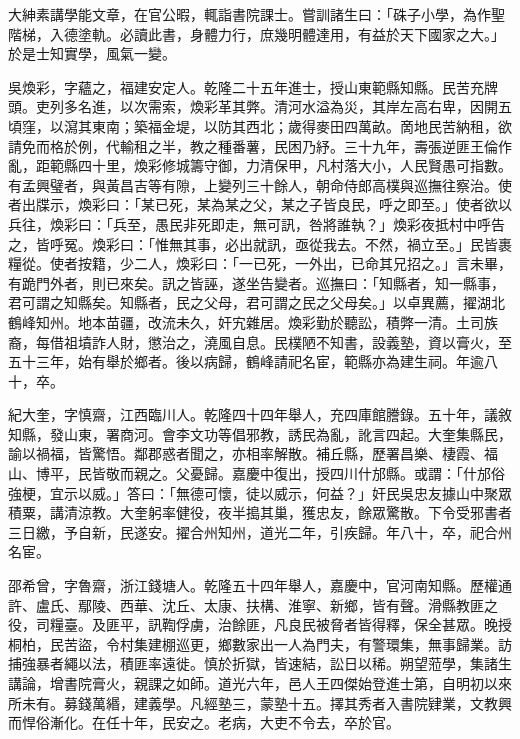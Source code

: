 \begin{pinyinscope}
大紳素講學能文章，在官公暇，輒詣書院課士。嘗訓諸生曰：「硃子小學，為作聖階梯，入德塗軌。必讀此書，身體力行，庶幾明體達用，有益於天下國家之大。」於是士知實學，風氣一變。

吳煥彩，字蘊之，福建安定人。乾隆二十五年進士，授山東範縣知縣。民苦充牌頭。吏列多名進，以次需索，煥彩革其弊。清河水溢為災，其岸左高右卑，因開五頃窪，以瀉其東南；築福金堤，以防其西北；歲得麥田四萬畝。啇地民苦納租，欲請免而格於例，代輸租之半，教之種番薯，民困乃紓。三十九年，壽張逆匪王倫作亂，距範縣四十里，煥彩修城籌守御，力清保甲，凡村落大小，人民賢愚可指數。有孟興璧者，與黃昌吉等有隙，上變列三十餘人，朝命侍郎高樸與巡撫往察治。使者出牒示，煥彩曰：「某已死，某為某之父，某之子皆良民，呼之即至。」使者欲以兵往，煥彩曰：「兵至，愚民非死即走，無可訊，咎將誰執？」煥彩夜抵村中呼告之，皆呼冤。煥彩曰：「惟無其事，必出就訊，亟從我去。不然，禍立至。」民皆裹糧從。使者按籍，少二人，煥彩曰：「一已死，一外出，已命其兄招之。」言未畢，有跪門外者，則已來矣。訊之皆誣，遂坐告變者。巡撫曰：「知縣者，知一縣事，君可謂之知縣矣。知縣者，民之父母，君可謂之民之父母矣。」以卓異薦，擢湖北鶴峰知州。地本苗疆，改流未久，奸宄雜居。煥彩勤於聽訟，積弊一清。土司族裔，每借祖墳詐人財，懲治之，澆風自息。民樸陋不知書，設義塾，資以膏火，至五十三年，始有舉於鄉者。後以病歸，鶴峰請祀名宦，範縣亦為建生祠。年逾八十，卒。

紀大奎，字慎齋，江西臨川人。乾隆四十四年舉人，充四庫館謄錄。五十年，議敘知縣，發山東，署商河。會李文功等倡邪教，誘民為亂，訛言四起。大奎集縣民，諭以禍福，皆驚悟。鄰郡惑者聞之，亦相率解散。補丘縣，歷署昌樂、棲霞、福山、博平，民皆敬而親之。父憂歸。嘉慶中復出，授四川什邡縣。或謂：「什邡俗強梗，宜示以威。」答曰：「無德可懷，徒以威示，何益？」奸民吳忠友據山中聚眾積粟，講清涼教。大奎躬率健役，夜半搗其巢，獲忠友，餘眾驚散。下令受邪書者三日繳，予自新，民遂安。擢合州知州，道光二年，引疾歸。年八十，卒，祀合州名宦。

邵希曾，字魯齋，浙江錢塘人。乾隆五十四年舉人，嘉慶中，官河南知縣。歷權通許、盧氏、鄢陵、西華、沈丘、太康、扶構、淮寧、新鄉，皆有聲。滑縣教匪之役，司糧臺。及匪平，訊鞫俘虜，治餘匪，凡良民被脅者皆得釋，保全甚眾。晚授桐柏，民苦盜，令村集建棚巡更，鄉數家出一人為門夫，有警環集，無事歸業。訪捕強暴者繩以法，積匪率遠徙。慎於折獄，皆速結，訟日以稀。朔望蒞學，集諸生講論，增書院膏火，親課之如師。道光六年，邑人王四傑始登進士第，自明初以來所未有。募錢萬緡，建義學。凡經塾三，蒙塾十五。擇其秀者入書院肄業，文教興而悍俗漸化。在任十年，民安之。老病，大吏不令去，卒於官。


\end{pinyinscope}